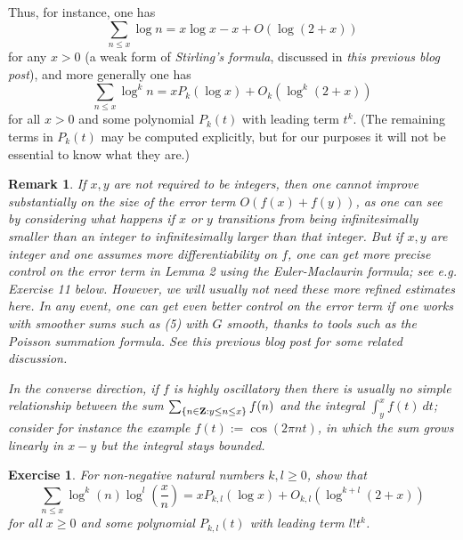 \documentclass[10pt,reqno]{amsart}
\newtheorem{exercise}[theorem]{Exercise}
\newtheorem{remark}[theorem]{Remark}
\begin{document}
Thus, for instance, one has
%
\begin{equation} \sum_{n \leq x} \log n = x \log x - x + O(\log(2+x)) \end{equation}
%
for any $x>0$ (a weak form of \emph{Stirling’s formula}, discussed in \emph{this previous blog post}), and more generally one has
%
\begin{equation} \sum_{n \leq x} \log^k n = x P_k(\log x) + O_k( \log^k(2+x)) \end{equation}
%
for all $x > 0$ and some polynomial $P_k(t)$ with leading term $t^k$. (The remaining terms in $P_k(t)$ may be computed explicitly, but for our purposes it will not be essential to know what they are.)

\begin{remark}
    If $x,y$ are not required to be integers, then one cannot improve substantially on the size of the error term $O(f(x)+f(y))$, as one can see by considering what happens if $x$ or $y$ transitions from being infinitesimally smaller than an integer to infinitesimally larger than that integer. But if $x,y$ are integer and one assumes more differentiability on $f$, one can get more precise control on the error term in Lemma 2 using \emph{the Euler-Maclaurin formula}; see e.g. Exercise 11 below. However, we will usually not need these more refined estimates here. In any event, one can get even better control on the error term if one works with smoother sums such as (5) with $G$ smooth, thanks to tools such as the \emph{Poisson summation formula}. See \emph{this previous blog post} for some related discussion.

    In the converse direction, if $f$ is highly oscillatory then there is usually no simple relationship between the sum $\sum_{\{n \in {\bf Z}: y \leq n \leq x\}} f(n)$ and the integral $\int_y^x f(t)\ dt$; consider for instance the example $f(t) := \cos(2\pi n t)$, in which the sum grows linearly in $x-y$ but the integral stays bounded.
\end{remark}

\begin{exercise}
    For non-negative natural numbers $k,l \geq 0$, show that
    \begin{equation} \sum_{n \leq x} \log^k(n) \log^l \left( \frac{x}{n} \right) = x P_{k,l}(\log x) + O_{k,l}(\log^{k+l}(2+x)) \end{equation}
    for all $x \geq 0$ and some polynomial $P_{k,l}(t)$ with leading term $l! t^k$.
\end{exercise}
\end{document}
